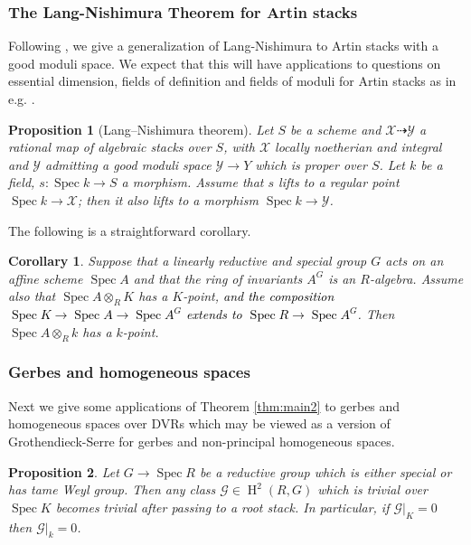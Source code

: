 \documentclass{amsart}
\newtheorem{corollary}[corollary]{Corollary}
\newtheorem{proposition}[proposition]{Proposition}
\theoremstyle{definition}
\newcommand{\cG}{\mathcal{G}}
\newcommand{\cX}{\mathcal{X}}
\newcommand{\cY}{\mathcal{Y}}
\newcommand{\oH}{\operatorname{H}}
\DeclareMathOperator{\Spec}{Spec}
\newcommand{\spec}{\operatorname{Spec}}
\begin{document}
\subsubsection{The Lang-Nishimura Theorem for Artin stacks} Following \cite{bresciani2024arithmetic}, we give a generalization of Lang-Nishimura to Artin stacks with a good moduli space. We expect that this will have applications to questions on essential dimension, fields of definition and fields of moduli for Artin stacks as in e.g. \cite{BV2,ed_stacks}.

\begin{proposition}[Lang–Nishimura theorem]\label{prop_LN}
    Let $S$ be a scheme and $\cX\dashrightarrow \cY$ a rational map of algebraic stacks
over $S$, with $\cX$ locally noetherian and integral and $\cY$ admitting a good moduli space $\cY\to Y$ which is proper over $S$. Let
$k$ be a field, $s: \spec k \to S$ a morphism. Assume that $s$ lifts to a regular point
$\spec k\to \cX$; then it also lifts to a morphism $\spec k\to \cY$.
\end{proposition} 

The following is a straightforward corollary. 

\begin{corollary}\label{cor:LN_1}
     Suppose that a linearly reductive and special group $G$ acts on an affine scheme $\spec A$ and that the ring of invariants $A^G$ is an $R$-algebra. Assume also that $\spec A\otimes_R K$ has a $K$-point, \textcolor{black}{and the composition $\spec K\to\spec A\to\spec A^G$ extends to $\spec R\to \spec A^G$}. Then $\spec A \otimes_R k$ has a $k$-point.
\end{corollary}

\subsubsection{Gerbes and homogeneous spaces} Next we give some applications of Theorem \ref{thm:main2} to gerbes and homogeneous spaces over DVRs which may be viewed as a version of Grothendieck-Serre for gerbes and non-principal homogeneous spaces. 

\begin{proposition}\label{prop_gs_tame}
    Let $G \to \spec R$ be a reductive group which is either special or has tame Weyl group. Then any class $\cG \in \oH^2(R,G)$ which is trivial over $\Spec K$ becomes trivial after passing to a root stack. In particular, if $\cG|_K = 0$ then $\cG|_k = 0$. 
\end{proposition}
\end{document}

